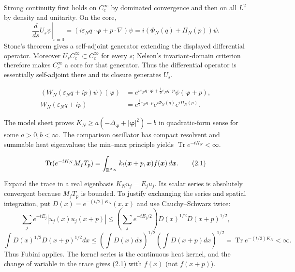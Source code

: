 \documentclass[11pt,a4paper]{article}
\newcommand{\eps}{\varepsilon}
\DeclareMathOperator{\Tr}{Tr}
\begin{document}

\Because Strong continuity first holds on $C_c^\infty$ by dominated convergence and
then on all $L^2$ by density and unitarity.  On the core,
\[
 \left.\frac d{ds}U_s\psi\right|_{s=0}
 =(i\eps_Nq\cdot\bm\varphi+p\cdot\nabla)\psi
 =i(\Phi_N(q)+\Pi_N(p))\psi.
\]
Stone's theorem gives a self-adjoint generator extending the displayed differential
operator.  Moreover $U_sC_c^\infty\subset C_c^\infty$ for every $s$; Nelson's
invariant-domain criterion therefore makes $C_c^\infty$ a core for that generator.
Thus the differential operator is essentially self-adjoint there and its closure
generates $U_s$.

\begin{align}
 (W_N(\eps_Nq+ip)\psi)(\bm\varphi)
 &=e^{i\eps_Nq\cdot\bm\varphi+\frac i2\eps_Nq\cdot p}
   \psi(\bm\varphi+p),\tag{1.1}\\
 W_N(\eps_Nq+ip)
 &=e^{\frac i2\eps_Nq\cdot p}e^{i\Phi_N(q)}e^{i\Pi_N(p)}.\tag{1.2}
\end{align}

\QedStep



\Because The model sheet proves
$K_N\ge a(-\Delta_{\bm\varphi}+|\bm\varphi|^2)-b$ in quadratic-form sense
for some $a>0,b<\infty$.  The comparison oscillator has compact resolvent and
summable heat eigenvalues; the min--max principle yields
$\Tr e^{-tK_N}<\infty$.

\[
 \Tr(e^{-tK_N}M_fT_p)=\int_{\R^{\Lambda_N}}
 k_t(\bm x+p,\bm x)f(\bm x)\,d\bm x.\tag{2.1}
\]

\Because Expand the trace in a real eigenbasis $K_Nu_j=E_ju_j$.  Its scalar series
is absolutely convergent because $M_fT_p$ is bounded.  To justify exchanging the
series and spatial integration, put $D(x)=e^{-(t/2)K_N}(x,x)$ and use
Cauchy--Schwarz twice:
\[
 \sum_j e^{-tE_j}|u_j(x)u_j(x+p)|
 \le \left(\sum_je^{-tE_j/2}\right)D(x)^{1/2}D(x+p)^{1/2},
\]
\[
 \int D(x)^{1/2}D(x+p)^{1/2}dx
 \le\left(\int D(x)dx\right)^{1/2}
     \left(\int D(x+p)dx\right)^{1/2}
 =\Tr e^{-(t/2)K_N}<\infty.
\]
Thus Fubini applies.  The kernel series is the continuous heat kernel, and the
change of variable in the trace gives (2.1) with $f(x)$ (not $f(x+p)$).
\end{document}
